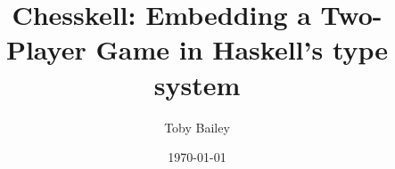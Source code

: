 \documentclass[12pt, a4paper, bibliography=notnumbered]{scrreprt}
\title{Chesskell: Embedding a Two-Player Game in Haskell's type system}
\author{Toby Bailey}
\date{\today}
\begin{document}
\begin{titlepage}
    \maketitle
\end{titlepage}



{
    \newpage  %
    \renewcommand{\normalfont}{\usekomafont{sectioning}}
}















\end{document}
